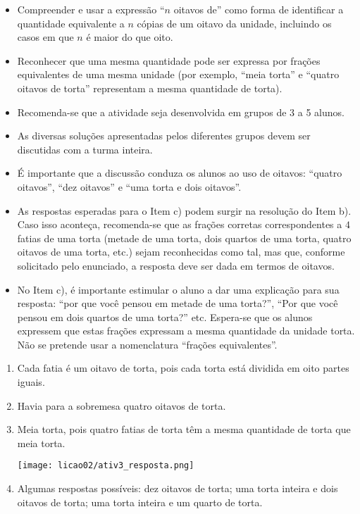 \clearpage
\begin{atividade}\label{chap2-ativ4}
\objetivos
\begin{itemize} %
\item Compreender e usar a expressão ``$n$ oitavos de'' como forma de identificar a quantidade equivalente a $n$ cópias de um oitavo da unidade, incluindo os casos em que $n$ é maior do que oito.
\item Reconhecer que uma mesma quantidade pode ser expressa por frações equivalentes de uma mesma unidade (por exemplo, ``meia torta'' e ``quatro oitavos de torta'' representam a mesma quantidade de torta).
\end{itemize} %

\discussoes
\begin{itemize} %
    \item Recomenda-se que a atividade seja desenvolvida em grupos de 3 a 5 alunos.
    \item As diversas soluções apresentadas pelos diferentes grupos devem ser discutidas com a turma inteira.
    \item É importante que a discussão conduza os alunos ao uso de oitavos:  ``quatro oitavos'', ``dez oitavos'' e ``uma torta e dois oitavos''.
     \item As respostas esperadas para o Item c) podem surgir na resolução do Item b). Caso isso aconteça, recomenda-se que as frações corretas correspondentes a $4$ fatias de uma torta (metade de uma torta, dois quartos de uma torta, quatro oitavos de uma torta, etc.) sejam reconhecidas como tal, mas que, conforme solicitado pelo enunciado, a resposta deve ser dada em termos de oitavos.
     \item No Item c), é importante estimular o aluno a dar uma explicação para sua resposta: ``por que você pensou em metade de uma torta?'', ``Por que você pensou em dois quartos de uma torta?'' etc. Espera-se que os alunos expressem que estas frações expressam a mesma quantidade da unidade torta. Não se pretende usar a nomenclatura ``frações equivalentes''.
\end{itemize}

\solucao
\begin{enumerate} %
    \item       Cada fatia é um oitavo de torta, pois cada torta está dividida em oito partes iguais.
    \item       Havia para a sobremesa quatro oitavos de torta.
    \item       Meia torta, pois quatro fatias de torta têm a mesma quantidade de torta que meia torta.

  \begin{center}
  \texttt{[image: licao02/ativ3\_resposta.png]}
  \end{center}

    \item       Algumas respostas possíveis: dez oitavos de torta;  uma torta inteira e dois oitavos de torta; uma torta inteira e um quarto de torta.
\end{enumerate} %

\end{atividade}

